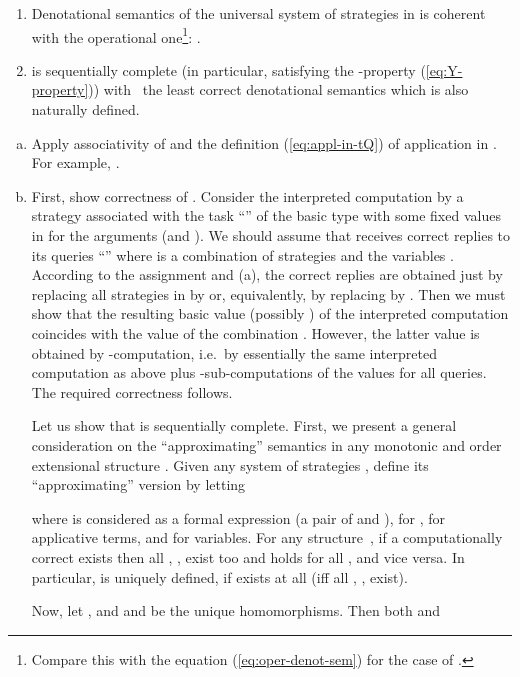 \documentclass[fleqn]{LMCS}
\theoremstyle{plain}\newtheorem{satz}[thm]{Satz}
\theoremstyle{plain}\newtheorem{hyp}[thm]{Hypothesis}
\theoremstyle{plain}\newtheorem{hyps}[thm]{Hypotheses}
\theoremstyle{definition}\newtheorem{note}[thm]{Note}
\newcommand{\?}{\mbox{?}}
\begin{document}
\begin{thm}\hfill  \label{th:least-correct-sem}
\begin{enumerate}[\em(a)]
\item Denotational semantics 
of the universal system of strategies  in  is coherent 
with the operational one\footnote{Compare this with the equation (\ref{eq:oper-denot-sem}) for 
the case of . 
}:
. 

\item  is sequentially complete 
(in particular, satisfying the -property (\ref{eq:Y-property})) 
with~ the least correct denotational semantics 
which is also naturally defined. 
\end{enumerate}
\end{thm}
\proof\hfill  \begin{enumerate}[(a)]
\item Apply associativity of  and the definition 
(\ref{eq:appl-in-tQ}) of application in . 
For example, . 

\item First, show correctness of . 
Consider the interpreted computation by a strategy  
associated with the task ``'' 
of the basic type
with some fixed values  in  
for the arguments  (and
). We should assume that  receives correct replies to its queries
``'' where  is a combination of strategies
 and the variables . According to the assignment  
and (a),
the correct replies are obtained
just by replacing all strategies  in  by  or, equivalently, by replacing
 by 
.
Then we must show that the resulting basic value  
(possibly ) 
of the interpreted 
computation coincides with the value of the combination
.
However, the latter value is
obtained by -computation, i.e.\ by 
essentially the same interpreted computation as above 
plus -sub-computations of the values
 for all queries.
The required correctness follows.


Let us show 
that  is sequentially complete.
First, we present a general consideration on the ``approximating'' semantics  
in any monotonic and order extensional structure . 
Given any system of strategies , define its 
``approximating'' 
version  by letting 

where  is considered as a formal expression (a pair of  and ), 
 for ,  for applicative terms, 
and  for variables. 
For any structure~, if a computationally correct 
 exists 
then all , , exist too and 
 holds for all , and vice versa. 
In particular,  is uniquely defined, if exists at all 
(iff all , , exist). 


Now, let , and 
 and  be the unique homomorphisms. 
Then both  and 
 

\end{enumerate}
\end{document}
